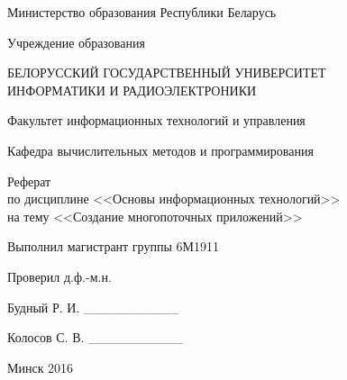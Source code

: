 \begin{titlepage}
\thispagestyle{empty}
\setlength{\parindent}{0cm} %

{\centering{}
  Министерство образования Республики Беларусь

  \smallskip
  Учреждение образования

  БЕЛОРУССКИЙ ГОСУДАРСТВЕННЫЙ УНИВЕРСИТЕТ \\
  ИНФОРМАТИКИ И РАДИОЭЛЕКТРОНИКИ

  \smallskip
  Факультет информационных технологий и управления

  \smallskip
  Кафедра вычислительных методов и программирования\par
}

\vspace{50mm}

{\centering{}
  Реферат \\
  по дисциплине <<Основы информационных технологий>> \\
  на тему <<Создание многопоточных приложений>>\par
}

\vspace{50mm}

\begin{minipage}{.55\linewidth}
  Выполнил магистрант группы 6М1911

  \smallskip
  Проверил д.ф.-м.н.
\end{minipage}
\hfill
\begin{minipage}{.4\linewidth}
  \begin{flushright}
    Будный Р. И. \_\_\_\_\_\_\_\_\_\_

    \smallskip
    Колосов С. В. \_\_\_\_\_\_\_\_\_\_
  \end{flushright}
\end{minipage}

\vfill
{\centering{}
  Минск 2016\par
}

\setlength{\parindent}{1.25cm} %
\end{titlepage}
